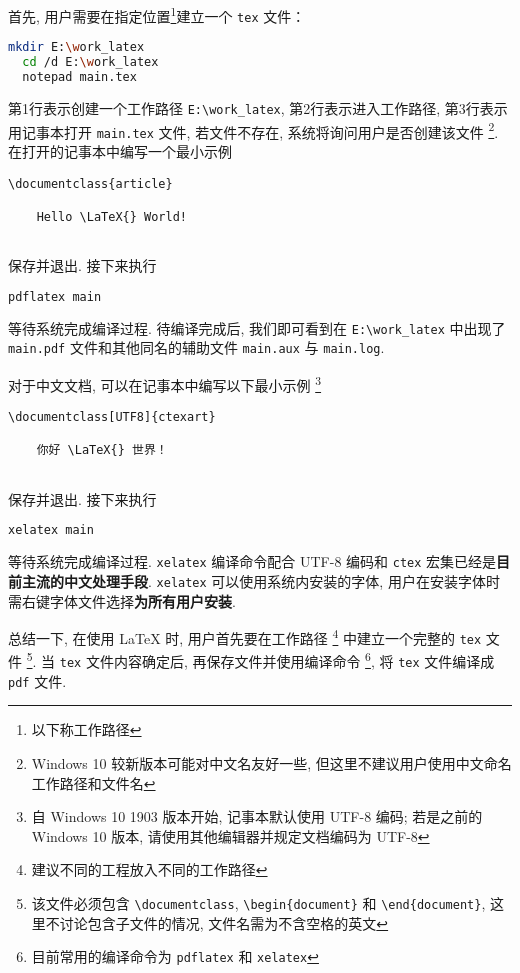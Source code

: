 首先, 用户需要在指定位置\footnote{以下称工作路径}建立一个 \texttt{tex} 文件：
\begin{lstlisting}[language = bash]
  mkdir E:\work_latex
  cd /d E:\work_latex
  notepad main.tex
\end{lstlisting}
第1行表示创建一个工作路径 \texttt{E:\textbackslash work\_latex},
第2行表示进入工作路径, 第3行表示用记事本打开 \texttt{main.tex} 文件,
若文件不存在, 系统将询问用户是否创建该文件%
\footnote{Windows 10 较新版本可能对中文名友好一些,
但这里不建议用户使用中文命名工作路径和文件名}.
在打开的记事本中编写一个最小示例
\begin{lstlisting}[language={[LaTeX]TeX}]
  \documentclass{article}
  
    Hello \LaTeX{} World!
  
\end{lstlisting}
保存并退出. 
接下来执行
\begin{lstlisting}[language=bash]
  pdflatex main
\end{lstlisting}
等待系统完成编译过程. 
待编译完成后, 我们即可看到在 \texttt{E:\textbackslash work\_latex}
中出现了 \texttt{main.pdf} 文件和其他同名的辅助文件
\texttt{main.aux} 与 \texttt{main.log}. 

对于中文文档, 可以在记事本中编写以下最小示例%
\footnote{自 Windows 10 1903 版本开始, 记事本默认使用 UTF-8 编码;
若是之前的 Windows 10 版本, 请使用其他编辑器并规定文档编码为 UTF-8}%
\begin{lstlisting}[language={[LaTeX]TeX}]
  \documentclass[UTF8]{ctexart}
  
    你好 \LaTeX{} 世界！
  
\end{lstlisting}
保存并退出.
接下来执行
\begin{lstlisting}[language=bash]
  xelatex main
\end{lstlisting}
等待系统完成编译过程.
\texttt{xelatex} 编译命令配合 UTF-8 编码和 \texttt{ctex}
宏集已经是\textbf{目前主流的中文处理手段}.
\texttt{xelatex} 可以使用系统内安装的字体,
用户在安装字体时需右键字体文件选择\textbf{为所有用户安装}.

总结一下, 在使用 \LaTeX{} 时, 用户首先要在工作路径%
\footnote{建议不同的工程放入不同的工作路径}%
中建立一个完整的 \texttt{tex} 文件%
\footnote{该文件必须包含 \texttt{\textbackslash documentclass},
\texttt{\textbackslash begin\{document\}} 和
\texttt{\textbackslash end\{document\}},
这里不讨论包含子文件的情况,
文件名需为不含空格的英文}.
当 \texttt{tex} 文件内容确定后, 再保存文件并使用编译命令%
\footnote{目前常用的编译命令为 \texttt{pdflatex} 和 \texttt{xelatex}},
将 \texttt{tex} 文件编译成 \texttt{pdf} 文件. 

